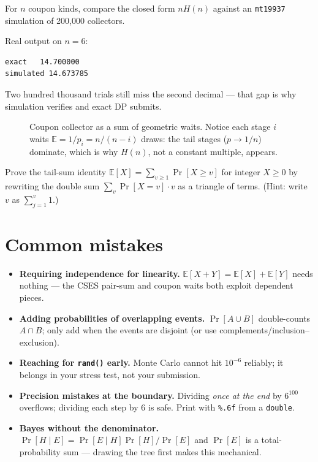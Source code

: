 \begin{example}
For $n$ coupon kinds, compare the closed form $nH(n)$ against
an \texttt{mt19937} simulation of 200{,}000 collectors.
\end{example}
\begin{solution}

Real output on $n=6$:
\begin{verbatim}
exact   14.700000
simulated 14.673785
\end{verbatim}
Two hundred thousand trials still miss the second decimal ---
that gap is why simulation verifies and exact DP submits.
\end{solution}
\begin{figure}[ht]\centering

\caption{Coupon collector as a sum of geometric waits. Notice
each stage $i$ waits $\mathbb{E}=1/p_i=n/(n-i)$ draws: the tail stages
($p\to 1/n$) dominate, which is why $H(n)$, not a constant
multiple, appears.}
\label{fig:coupon}
\end{figure}

\begin{exercise}[hard] Prove the tail-sum identity
$\mathbb{E}[X]=\sum_{v\ge1}\Pr[X\ge v]$ for integer $X\ge0$ by
rewriting the double sum $\sum_v\Pr[X=v]\cdot v$ as a triangle
of terms. (Hint: write $v$ as $\sum_{j=1}^{v}1$.)\end{exercise}

\section{Common mistakes}
\begin{itemize}
\item \textbf{Requiring independence for linearity.}
$\mathbb{E}[X+Y]=\mathbb{E}[X]+\mathbb{E}[Y]$ needs nothing --- the CSES pair-sum and
coupon waits both exploit dependent pieces.
\item \textbf{Adding probabilities of overlapping events.}
$\Pr[A\cup B]$ double-counts $A\cap B$; only add when the
events are disjoint (or use complements/inclusion--exclusion).
\item \textbf{Reaching for \texttt{rand()} early.} Monte Carlo
cannot hit $10^{-6}$ reliably; it belongs in your stress test,
not your submission.
\item \textbf{Precision mistakes at the boundary.} Dividing
\emph{once at the end} by $6^{100}$ overflows; dividing each
step by $6$ is safe. Print with \texttt{\%.6f} from a
\texttt{double}.
\item \textbf{Bayes without the denominator.}
$\Pr[H\mid E]=\Pr[E\mid H]\Pr[H]/\Pr[E]$ and $\Pr[E]$ is a
total-probability sum --- drawing the tree first makes this
mechanical.
\end{itemize}

